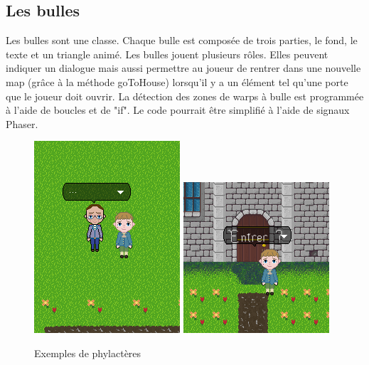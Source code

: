 \documentclass[11pt]{article}
\begin{document}
\subsection{Les bulles}
Les bulles sont une classe. Chaque bulle est composée de trois parties, le fond, le texte et un triangle animé. Les bulles jouent plusieurs rôles. Elles peuvent indiquer un dialogue mais aussi permettre au joueur de rentrer dans une nouvelle map (grâce à la méthode goToHouse) lorsqu'il y a un élément tel qu'une porte que le joueur doit ouvrir. La détection des zones de warps à bulle est programmée à l'aide de boucles et de "if". Le code pourrait être simplifié à l'aide de signaux Phaser.
\begin{figure}[H]
\includegraphics[scale=0.5]{bulleDialog}
\includegraphics[scale=0.5]{bulleMaison}
\centering
\caption{Exemples de phylactères}
\end{figure}
\end{document}
